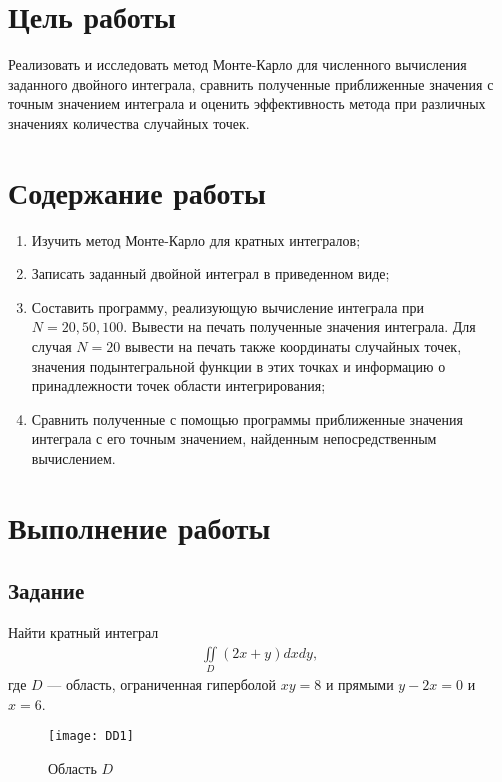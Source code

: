 \section{Цель работы}
Реализовать и исследовать метод Монте-Карло для численного вычисления заданного двойного интеграла, сравнить полученные приближенные значения с точным значением интеграла и оценить эффективность метода при различных значениях количества случайных точек.
\section{Содержание работы}
\begin{enumerate}
	\item Изучить метод Монте-Карло для кратных интегралов;
	\item Записать заданный двойной интеграл в приведенном виде;
	\item Составить программу, реализующую вычисление интеграла при \(N=20,50,100\). Вывести на печать полученные значения интеграла. Для случая \(N=20\) вывести на печать также координаты случайных точек, значения подынтегральной функции в этих точках и информацию о принадлежности точек области интегрирования;
	\item Сравнить полученные с помощью программы приближенные значения интеграла с его точным значением, найденным непосредственным вычислением.
\end{enumerate}

\section{Выполнение работы}
\subsection{Задание}
Найти кратный интеграл
\begin{align}
	\iint\limits_D(2x+y)dxdy,
\end{align}
где \(D\) --- область, ограниченная гиперболой \(xy=8\) и прямыми \(y-2x = 0\) и \(x=6\).
\begin{figure}[h]
	\centering
	\texttt{[image: DD1]}
	\caption{Область \(D\)}
\end{figure}





